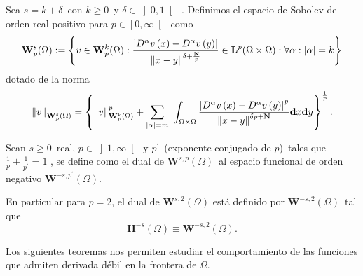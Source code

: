 \begin{defi}
	Sea $s=k+\delta $\ con $k\geqslant 0$\ y $\delta \in \left] 0,1\right[ $\ .
	Definimos el espacio de Sobolev de orden real positivo para $p\in \left[
	0,\infty \right[ $\ como
	\[
	\mathbf{W}_{p}^{s}(\Omega ):=\left\{ v\in \mathbf{W}_{p}^{k}(\Omega ):\frac{%
		\left| D^{\alpha }v\left( x\right) -D^{\alpha }v\left( y\right) \right| }{%
		\left\| x-y\right\| ^{\delta +\frac{\mathbf{N}}{p}}}\in \mathbf{L}%
	^{p}(\Omega \times \Omega ):\forall \alpha :\left| \alpha \right| =k\right\}
	\]
	dotado de la norma
	\[
	\left\| v\right\| _{\mathbf{W}_{p}^{s}(\Omega )}=\left\{ \left\| v\right\| _{%
		\mathbf{W}_{p}^{k}(\Omega )}^{p}+\sum_{\left| \alpha \right|
		=m}\,\,\int_{\Omega \times \Omega }\frac{\left| D^{\alpha }v\left(
		x\right) -D^{\alpha }v\left( y\right) \right| ^{p}}{\left\| x-y\right\|
		^{\delta p+\mathbf{N}}}\mathbf{d}x\mathbf{d}y\right\} ^{\frac{1}{p}}.
	\]
\end{defi}
\begin{defi}
	Sean $s\geqslant 0$\ real, $p\in \left] 1,\infty \right[ $\ y $p^{\prime }$\
	(exponente conjugado de $p$)\ tales que $\frac{1}{p}+\frac{1}{p^{\prime }}=1$%
	, se define como el dual de $\mathbf{W}^{s,p}\left( \Omega \right) $\ al
	espacio funcional de orden negativo $\mathbf{W}^{-s,p^{\prime }}(\Omega )$.
	
	En particular para $p=2$, el dual de $\mathbf{W}^{s,2}(\Omega )$ está
	definido por $\mathbf{W}^{-s,2}(\Omega )$\ tal que
	\[
	\mathbf{H}^{-s}(\Omega )\equiv \mathbf{W}^{-s,2}(\Omega ).
	\]
\end{defi}
Los siguientes teoremas nos permiten estudiar el comportamiento de las
funciones que admiten derivada débil en la frontera de $\Omega $.
